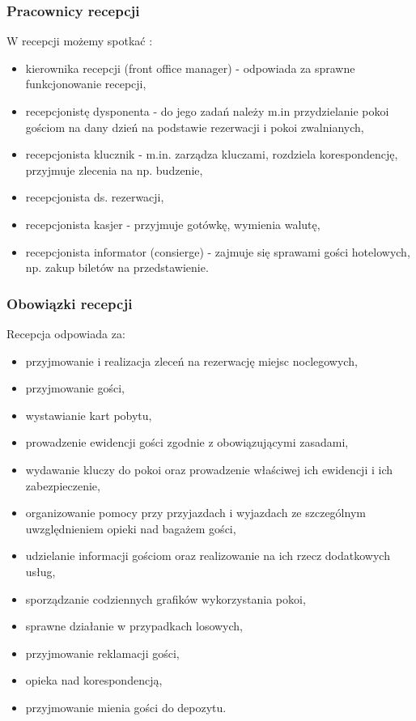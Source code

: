 \documentclass[a4paper,onecolumn,oneside,11pt,wide,floatssmall]{mwrep}
\theoremstyle{definition}
\theoremstyle{plain}%
\theoremstyle{remark}
\begin{document}
\subsubsection{Pracownicy recepcji}
W recepcji możemy spotkać \cite[47-51]{OrgaDzialHot}:

\begin{itemize}
  \item kierownika recepcji (front office manager) - odpowiada za sprawne 
  funkcjonowanie recepcji,
  \item recepcjonistę dysponenta - do jego zadań należy m.in przydzielanie 
  pokoi gościom na dany dzień na podstawie rezerwacji i pokoi zwalnianych,
  \item recepcjonista klucznik - m.in. zarządza kluczami, rozdziela 
  korespondencję, przyjmuje zlecenia na np. budzenie,
  \item recepcjonista ds. rezerwacji,
  \item recepcjonista kasjer - przyjmuje gotówkę, wymienia walutę,
  \item recepcjonista informator (consierge) - zajmuje się sprawami gości 
  hotelowych, np. zakup biletów na przedstawienie.
\end{itemize}

\subsubsection{Obowiązki recepcji} 
Recepcja odpowiada za\cite[50]{OrgaDzialHot}:

\begin{itemize}
  \item przyjmowanie i realizacja zleceń na rezerwację miejsc noclegowych,
  \item przyjmowanie gości,
  \item wystawianie kart pobytu,
  \item prowadzenie ewidencji gości zgodnie z obowiązującymi zasadami,
  \item wydawanie kluczy do pokoi oraz prowadzenie właściwej ich ewidencji i 
  ich zabezpieczenie,
  \item organizowanie pomocy przy przyjazdach i wyjazdach ze szczególnym 
  uwzględnieniem opieki nad bagażem gości,
  \item udzielanie informacji gościom oraz realizowanie na ich rzecz 
  dodatkowych usług,
  \item sporządzanie codziennych grafików wykorzystania pokoi,
  \item sprawne działanie w przypadkach losowych,
  \item przyjmowanie reklamacji gości,
  \item opieka nad korespondencją,
  \item przyjmowanie mienia gości do depozytu.
\end{itemize}
\end{document}
